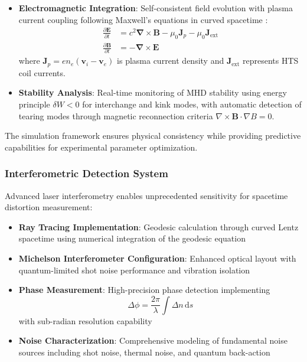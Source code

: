 \documentclass[12pt,a4paper]{article}
\newcommand{\ddt}[1]{\frac{\partial #1}{\partial t}}
\newcommand{\curl}{\boldsymbol{\nabla} \times}
\newcommand{\dd}[1]{\,\mathrm{d}#1}
\begin{document}
\begin{itemize}
\item \textbf{Electromagnetic Integration}: Self-consistent field evolution with plasma current coupling following Maxwell's equations in curved spacetime \cite{Maxwell1865,Weyl1918}:
\begin{align}
\ddt{\mathbf{E}} &= c^2 \curl \mathbf{B} - \mu_0 \mathbf{J}_p - \mu_0 \mathbf{J}_{\text{ext}} \\
\ddt{\mathbf{B}} &= -\curl \mathbf{E}
\end{align}
where $\mathbf{J}_p = en_e(\mathbf{v}_i - \mathbf{v}_e)$ is plasma current density and $\mathbf{J}_{\text{ext}}$ represents HTS coil currents.

\item \textbf{Stability Analysis}: Real-time monitoring of MHD stability using energy principle $\delta W < 0$ for interchange and kink modes, with automatic detection of tearing modes through magnetic reconnection criteria $\nabla \times \mathbf{B} \cdot \nabla B = 0$.
\end{itemize}

The simulation framework ensures physical consistency while providing predictive capabilities for experimental parameter optimization.

\subsubsection{Interferometric Detection System}

Advanced laser interferometry enables unprecedented sensitivity for spacetime distortion measurement:

\begin{itemize}
\item \textbf{Ray Tracing Implementation}: Geodesic calculation through curved Lentz spacetime using numerical integration of the geodesic equation
\item \textbf{Michelson Interferometer Configuration}: Enhanced optical layout with quantum-limited shot noise performance and vibration isolation
\item \textbf{Phase Measurement}: High-precision phase detection implementing 
\begin{equation}
\Delta\phi = \frac{2\pi}{\lambda} \int \Delta n \dd{s}
\end{equation}
with sub-radian resolution capability
\item \textbf{Noise Characterization}: Comprehensive modeling of fundamental noise sources including shot noise, thermal noise, and quantum back-action
\end{itemize}
\end{document}
